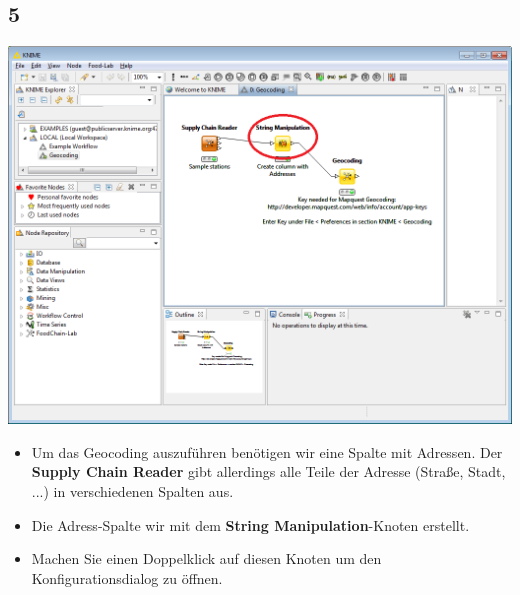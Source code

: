 \documentclass{beamer}
\begin{document}
\subsection{5}
\begin{frame}
	\begin{center}
  		\includegraphics[height=0.5\textheight]{5.png}
	\end{center}
	\begin{itemize}
		\item Um das Geocoding auszuführen benötigen wir eine Spalte mit Adressen. Der \textbf{Supply Chain Reader} gibt allerdings alle Teile der Adresse (Straße, Stadt, ...) in verschiedenen Spalten aus.
		\item Die Adress-Spalte wir mit dem \textbf{String Manipulation}-Knoten erstellt.
		\item Machen Sie einen Doppelklick auf diesen Knoten um den Konfigurationsdialog zu öffnen.
	\end{itemize}
\end{frame}
\end{document}
